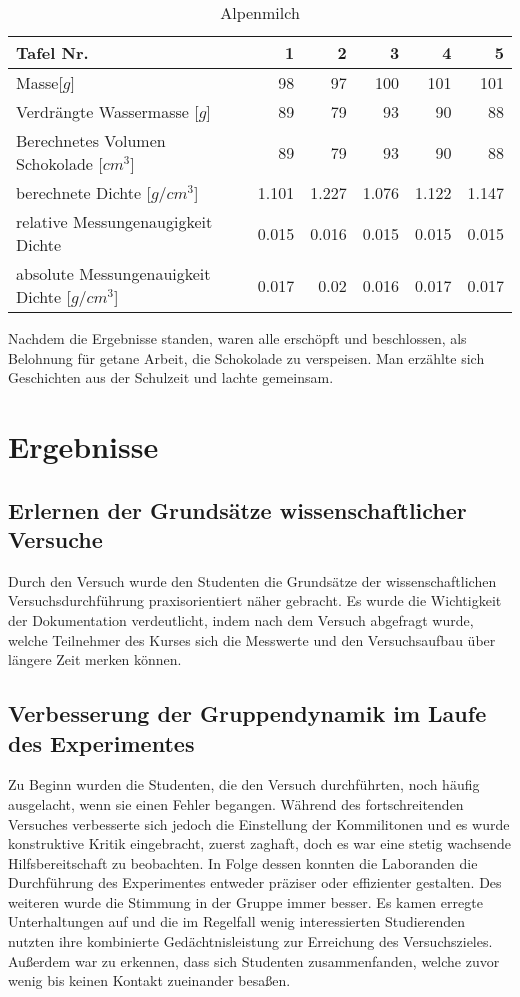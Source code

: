 \documentclass[12pt]{scrartcl}
\begin{document}
\begin{table}[h!]
	  \center
	  \caption{Alpenmilch}
      \label{tab:alpenmilch}	  
      \begin{tabular}{l|r|r|r|r|r}
      \toprule
      Tafel Nr. & 1 & 2 & 3 & 4 & 5\\
	  \midrule
      Masse[$g$] & 98 & 97 & 100 & 101 & 101\\
      \midrule
      Verdrängte Wassermasse [$g$] & 89 & 79 & 93 & 90 & 88\\
      \midrule
      Berechnetes Volumen Schokolade [$cm^3$] & 89 & 79 & 93 & 90 & 88\\
      \midrule
      berechnete Dichte [$g/cm^3$] & 1.101 & 1.227 & 1.076 & 1.122 & 1.147 \\
      \midrule
      relative Messungenaugigkeit Dichte & 0.015 & 0.016 & 0.015 & 0.015 & 0.015 \\
      \midrule
      absolute Messungenauigkeit Dichte [$g/cm^3$] & 0.017 & 0.02 & 0.016 & 0.017 & 0.017 \\
      \bottomrule
      \end{tabular}
	\end{table}
Nachdem die Ergebnisse standen, waren alle erschöpft und beschlossen, als Belohnung für getane Arbeit, die Schokolade zu verspeisen. Man erzählte sich Geschichten aus der Schulzeit und lachte gemeinsam.

\section{Ergebnisse}
\subsection{Erlernen der Grundsätze wissenschaftlicher Versuche}
Durch den Versuch wurde den Studenten die Grundsätze der wissenschaftlichen Versuchsdurchführung praxisorientiert näher gebracht. Es wurde die Wichtigkeit der Dokumentation verdeutlicht, indem nach dem Versuch abgefragt wurde, welche Teilnehmer des Kurses sich die Messwerte und den Versuchsaufbau über längere Zeit merken können.
\subsection{Verbesserung der Gruppendynamik im Laufe des Experimentes}
Zu Beginn wurden die Studenten, die den Versuch durchführten, noch häufig ausgelacht, wenn sie einen Fehler begangen. Während des fortschreitenden Versuches verbesserte sich jedoch die Einstellung der Kommilitonen und es wurde konstruktive Kritik eingebracht, zuerst zaghaft, doch es war eine stetig wachsende Hilfsbereitschaft zu beobachten. In Folge dessen konnten die Laboranden die Durchführung des Experimentes entweder präziser oder effizienter gestalten. Des weiteren wurde die Stimmung in der Gruppe immer besser. Es kamen erregte Unterhaltungen auf und die im Regelfall wenig interessierten Studierenden nutzten ihre kombinierte Gedächtnisleistung zur Erreichung des Versuchszieles. Außerdem war zu erkennen, dass sich Studenten zusammenfanden, welche zuvor wenig bis keinen Kontakt zueinander besaßen.
\end{document}
